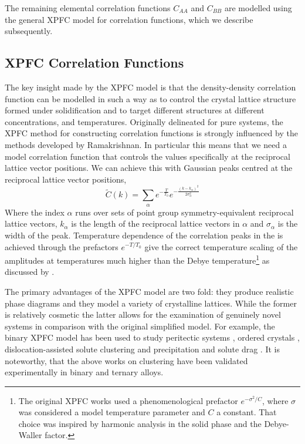 \documentclass[showkeys, prb, reprint]{revtex4-1}
\newcommand{\f}{\frac}          %
\begin{document}
The remaining elemental correlation functions $C_{AA}$ and $C_{BB}$ are modelled
using the general XPFC model for correlation functions, which we describe
subsequently.

\subsection{XPFC Correlation Functions} %

The key insight made by the XPFC model is that the density-density
correlation function can be modelled in such a way as to control the crystal
lattice structure formed under solidification and to target different structures at
different concentrations, and temperatures. Originally delineated for pure
systems, the XPFC method for constructing correlation functions is strongly
influenced by the methods developed by Ramakrishnan. In particular this means
that we need a model correlation function that controls the values specifically
at the reciprocal lattice vector positions. We can achieve this with Gaussian
peaks centred at the reciprocal lattice vector positions,
%
\begin{equation}
    \tilde{C}(k) = \sum_{\alpha} e^{-\f{T}{T_0}}
        e^{ - \f{(k - k_\alpha)^2}{2\sigma_\alpha^2}}
        \label{XPFC_C2}
\end{equation}
%
Where the index $\alpha$ runs over sets of point group symmetry-equivalent
reciprocal lattice vectors, $k_\alpha$ is the length of the reciprocal lattice
vectors in $\alpha$ and $\sigma_\alpha$ is the width of the peak. Temperature
dependence of the correlation peaks in the is achieved through the prefactors
$e^{-T / T_0}$ give the correct temperature scaling of the amplitudes at
temperatures much higher than the Debye temperature\footnote{The original XPFC
works used a phenomenological prefactor $e^{-\sigma^2 / C}$, where $\sigma$
was considered a model temperature parameter and $C$ a constant. That choice
was inspired by harmonic analysis in the solid phase and the Debye-Waller
factor.} as discussed by \cite{ALSTER17}.

The primary advantages of the XPFC model are two fold: they produce realistic
phase diagrams and they model a variety of crystalline lattices. While the
former is relatively cosmetic the latter allows for the examination of
genuinely novel systems in comparison with the original simplified model. For
example, the binary XPFC model has been used to study peritectic systems
\cite{GREENWOOD11_BINARY}, ordered crystals \cite{ALSTER17},
dislocation-assisted solute clustering and precipitation \cite{FALLAH12,
FALLAH13} and solute drag \cite{GREENWOOD12}. It is noteworthy, that the above
works on clustering have been validated experimentally in binary and ternary
alloys.
\end{document}
